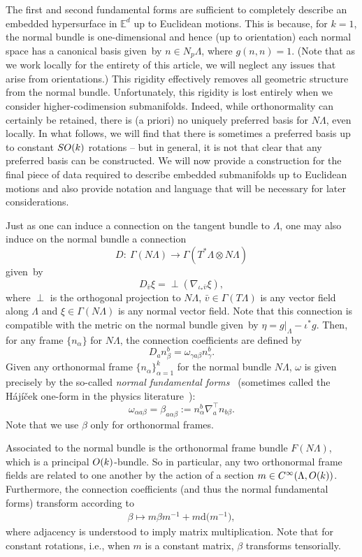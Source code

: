 \documentclass[11pt]{article}
\numberwithin{equation}{section}
\renewcommand{\=}{\stackrel \Lambda =}
\begin{document}
The first and second fundamental forms are sufficient to completely describe an embedded hypersurface in $\mathbb{E}^d$ up to Euclidean motions. This is because, for $k=1$, the normal bundle is one-dimensional and hence (up to orientation) each normal space has a canonical basis given~by $n \in N_p \Lambda$, where $g(n,n) = 1$. (Note that as we work locally for the entirety of this article, we will neglect any issues that arise from orientations.) This rigidity effectively removes all geometric structure from the normal bundle. Unfortunately, this rigidity is lost entirely when we consider higher-codimension submanifolds. Indeed, while orthonormality can certainly be retained, there is (a priori) no uniquely preferred basis for $N \Lambda$, even locally. In what follows, we will find that there is sometimes a preferred basis up to constant ${\rm SO}(k)$ rotations -- but in general, it is not that clear that any preferred basis can be constructed. We will now provide a construction for the final piece of data required to describe embedded submanifolds up to Euclidean motions and also provide notation and language that will be necessary for later considerations.

Just as one can induce a connection on the tangent bundle to $\Lambda$, one may also induce on the normal bundle a connection
\[
D \colon \ \Gamma(N \Lambda) \rightarrow \Gamma(T^* \Lambda \otimes N \Lambda)
\]
given~by
\[
D_{\bar v} \xi = {\perp} (\nabla_{\iota_* \bar{v}} \xi) ,
\]
where $\perp$ is the orthogonal projection to $N \Lambda$, $\bar{v} \in \Gamma(T \Lambda)$ is any vector field along $\Lambda$ and $\xi \in \Gamma(N \Lambda)$ is any normal vector field. Note that this connection is compatible with the metric on the normal bundle given~by $\eta = g|_{\Lambda} - \iota^* g$. Then, for any frame $\{n_{\alpha}\}$ for $N \Lambda$, the connection coefficients are defined by
\[
D_a n^b_{\beta} = \omega_{\gamma a \beta} n^b_{\gamma} .
\]
Given any orthonormal frame $\{n_{\alpha}\}_{\alpha = 1}^k$ for the normal bundle $N \Lambda$, $\omega$ is given precisely by the so-called \textit{normal fundamental forms}~\cite{Spivak} (sometimes called the H{\'a}j{\'i}{\v{c}}ek one-form in the physics literature~\cite{hajicek1975, hajicek1973}):
\[
\omega_{\alpha a \beta} = \beta_{a \alpha \beta} := n^b_{\alpha} \nabla^\top_a n_{b \beta} .
\]
Note that we use $\beta$ only for orthonormal frames.

Associated to the normal bundle is the orthonormal frame bundle $F(N \Lambda)$, which is a principal ${\rm O}(k)$-bundle. So in particular, any two orthonormal frame fields are related to one another by the action of a section $m \in C^\infty(\Lambda, {\rm O}(k))$. Furthermore, the connection coefficients (and thus the normal fundamental forms) transform according to
\begin{align} \label{beta-transf}
\beta \mapsto m \beta m^{-1} + m \mathrm{d} \bigl(m^{-1}\bigr) ,
\end{align}
where adjacency is understood to imply matrix multiplication.
Note that for constant rotations, i.e., when $m$ is a constant matrix, $\beta$ transforms tensorially.
\end{document}
